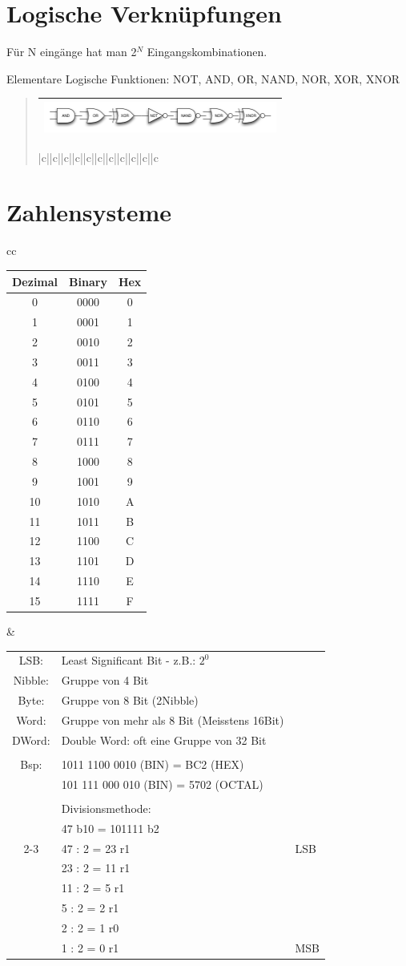 
\section*{Logische Verknüpfungen}

Für N eingänge hat man 2$^{N}$ Eingangskombinationen.

Elementare Logische Funktionen: NOT, AND, OR, NAND, NOR, XOR, XNOR
\begin{verse}
\begin{tabular}{|c||c||c||c||c||c||c||c||c||c||c}
\hline 
\multicolumn{11}{|c}{\includegraphics[height=1cm]{DT/img/baust}}\tabularnewline
\hline 
\end{tabular}%
\begin{tabular}{|c||c||c||c||c||c||c||c||c||c||c}
\hline 
{}\tabularnewline
\hline 
\end{tabular}
\end{verse}

\section*{Zahlensysteme}

\begin{tabular}{cc}
\begin{tabular}{|c|c|c|}
\hline 
Dezimal & Binary & Hex\tabularnewline
\hline 
\hline 
0 & 0000 & 0\tabularnewline
\hline 
1 & 0001 & 1\tabularnewline
\hline 
2 & 0010 & 2\tabularnewline
\hline 
3 & 0011 & 3\tabularnewline
\hline 
4 & 0100 & 4\tabularnewline
\hline 
5 & 0101 & 5\tabularnewline
\hline 
6 & 0110 & 6\tabularnewline
\hline 
7 & 0111 & 7\tabularnewline
\hline 
8 & 1000 & 8\tabularnewline
\hline 
9 & 1001 & 9\tabularnewline
\hline 
10 & 1010 & A\tabularnewline
\hline 
11 & 1011 & B\tabularnewline
\hline 
12 & 1100 & C\tabularnewline
\hline 
13 & 1101 & D\tabularnewline
\hline 
14 & 1110 & E\tabularnewline
\hline 
15 & 1111 & F\tabularnewline
\hline 
\end{tabular} & %
\begin{tabular}{cll}
LSB: & Least Significant Bit - z.B.: $2^{0}$ & \tabularnewline
Nibble: & Gruppe von 4 Bit & \tabularnewline
Byte: & Gruppe von 8 Bit (2Nibble) & \tabularnewline
Word: & Gruppe von mehr als 8 Bit (Meisstens 16Bit) & \tabularnewline
DWord: & Double Word: oft eine Gruppe von 32 Bit & \tabularnewline
 &  & \tabularnewline
Bsp: & 1011 1100 0010 (BIN) = BC2 (HEX) & \tabularnewline
 & 101 111 000 010 (BIN) = 5702 (OCTAL) & \tabularnewline
 &  & \tabularnewline
 & Divisionsmethode: & \tabularnewline
 & 47 b10 = 101111 b2 & \tabularnewline
\cline{2-3} 
 & 47 : 2 = 23 r1 & LSB\tabularnewline
 & 23 : 2 = 11 r1 & \tabularnewline
 & 11 : 2 = 5 r1 & \tabularnewline
 & 5 : 2 = 2 r1 & \tabularnewline
 & 2 : 2 = 1 r0 & \tabularnewline
 & 1 : 2 = 0 r1 & MSB\tabularnewline
\end{tabular}\tabularnewline
\end{tabular}


